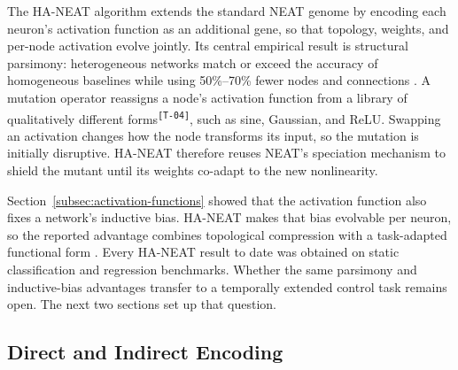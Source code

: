 \documentclass[12pt]{article}
\newcommand{\revID}[1]{\textsuperscript{\scriptsize\texttt{[#1]}}}
\newcommand{\revTerm}[2]{\textcolor{lrTeal}{#2}\revID{#1}}      %
\begin{document}
The HA-NEAT algorithm \parencite{hagg_evolving_2017} extends the standard NEAT genome by encoding each neuron's activation function as an additional gene, so that topology, weights, and per-node activation evolve jointly.
Its central empirical result is structural parsimony: heterogeneous networks match or exceed the accuracy of homogeneous baselines while using 50\%--70\% fewer nodes and connections \parencite{hagg_evolving_2017}.
A mutation operator reassigns a node's activation function \revTerm{T-04}{from a library of qualitatively different forms}, such as sine, Gaussian, and ReLU.
Swapping an activation changes how the node transforms its input, so the mutation is initially disruptive.
HA-NEAT therefore reuses NEAT's speciation mechanism to shield the mutant until its weights co-adapt to the new nonlinearity.

Section~\ref{subsec:activation-functions} showed that the activation function also fixes a network's inductive bias.
HA-NEAT makes that bias evolvable per neuron, so the reported advantage combines topological compression with a task-adapted functional form \parencite{papavasileiou_optimizing_2022}.
Every HA-NEAT result to date was obtained on static classification and regression benchmarks.
Whether the same parsimony and inductive-bias advantages transfer to a temporally extended control task remains open. The next two sections set up that question.


\subsection{Direct and Indirect Encoding}
\label{subsec:direct-and-indirect-encoding}
\end{document}
